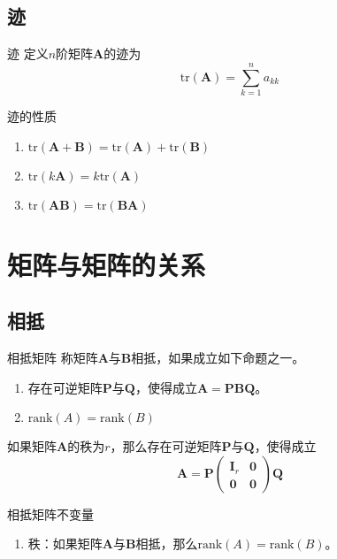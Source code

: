 \documentclass[lang = cn, scheme = chinese, thmcnt = section]{elegantbook}
\newcommand{\bs}{\boldsymbol}          %
\newcommand{\rank}{\text{rank}}        %
\newcommand{\tr}{\text{tr}}            %
\begin{document}
\subsection{迹}

\begin{definition}{迹}
	定义$n$阶矩阵$\bs{A}$的迹为
	$$
	\tr(\bs{A})=\sum_{k=1}^{n}a_{kk}
	$$
\end{definition}

\begin{proposition}{迹的性质}
	\begin{enumerate}
		\item $\tr(\bs{A}+\bs{B})=\tr(\bs{A})+\tr(\bs{B})$
		\item $\tr(k\bs{A})=k\tr(\bs{A})$
		\item $\tr(\bs{AB})=\tr(\bs{BA})$
	\end{enumerate}
\end{proposition}

\section{矩阵与矩阵的关系}

\subsection{相抵}

\begin{definition}{相抵矩阵}
	称矩阵$\bs{A}$与$\bs{B}$相抵，如果成立如下命题之一。
	\begin{enumerate}
		\item 存在可逆矩阵$\bs{P}$与$\bs{Q}$，使得成立$\bs{A}=\bs{PBQ}$。
		\item $\rank(A)=\rank(B)$
	\end{enumerate}
\end{definition}

\begin{theorem}
	如果矩阵$\bs{A}$的秩为$r$，那么存在可逆矩阵$\bs{P}$与$\bs{Q}$，使得成立
	$$
	\bs{A}=\bs{P}\begin{pmatrix}
		\bs{I}_r & \bs{0}\\
		\bs{0} & \bs{0}
	\end{pmatrix}\bs{Q}
	$$
\end{theorem}

\begin{proposition}{相抵矩阵不变量}
	\begin{enumerate}
		\item 秩：如果矩阵$\bs{A}$与$\bs{B}$相抵，那么$\rank(A)=\rank(B)$。
	\end{enumerate}
\end{proposition}
\end{document}
